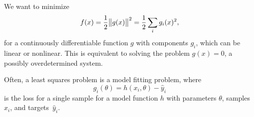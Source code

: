 \documentclass{article}
\begin{document}
\label{s:least-squares}

We want to minimize
\begin{equation*}
  f(x) = \frac{1}{2} \enVert[1]{g(x)}^2 = \frac{1}{2} \sum_i g_i(x)^2,
\end{equation*}
for a continuously differentiable function \(g\) with components \(g_i\), which can be linear or
nonlinear.  This is equivalent to solving the problem \(g(x) = 0\), a possibly overdetermined
system.

Often, a least squares problem is a model fitting problem, where
\begin{equation*}
  g_i(\theta) = h(x_i, \theta) - \hat{y}_i
\end{equation*}
is the loss for a single sample for a model function \(h\) with parameters \(\theta\), samples
\(x_i\), and targets~\(\hat{y}_i\).


\label{s:gauss-newton-method}
\end{document}
